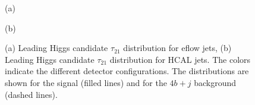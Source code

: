 \begin{figure}
	\begin{minipage}[t]{0.5\textwidth}
		\caption*{(a)}
	\end{minipage}%
	\hfill
	\begin{minipage}[t]{0.5\textwidth}
		\caption*{(b)}
	\end{minipage}
	\caption{(a) Leading Higgs candidate $\tau_{21}$ distribution for eflow jets, (b) Leading Higgs candidate $\tau_{21}$ distribution for HCAL jets. The colors indicate the different detector configurations. The distributions are shown for the signal (filled lines) and for the $4b+j$ background (dashed lines).}
	\label{fig:CompGran_sub}
\end{figure}

%

